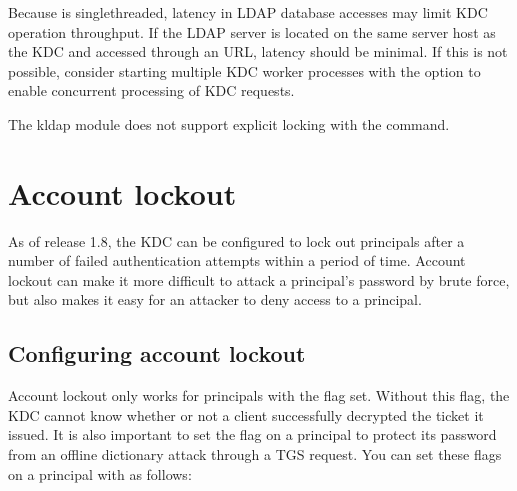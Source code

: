 \documentclass[letterpaper,10pt,english]{sphinxmanual}
\begin{document}
\sphinxAtStartPar
Because {\hyperref[\detokenize{admin/admin_commands/krb5kdc:krb5kdc-8}]{}} is single\sphinxhyphen{}threaded, latency in LDAP database
accesses may limit KDC operation throughput.  If the LDAP server is
located on the same server host as the KDC and accessed through an
 URL, latency should be minimal.  If this is not possible,
consider starting multiple KDC worker processes with the
{\hyperref[\detokenize{admin/admin_commands/krb5kdc:krb5kdc-8}]{}}  option to enable concurrent processing of KDC
requests.

\sphinxAtStartPar
The kldap module does not support explicit locking with the
{\hyperref[\detokenize{admin/admin_commands/kadmin_local:kadmin-1}]{}}  command.

\sphinxstepscope


\chapter{Account lockout}
\label{\detokenize{admin/lockout:account-lockout}}\label{\detokenize{admin/lockout:lockout}}\label{\detokenize{admin/lockout::doc}}
\sphinxAtStartPar
As of release 1.8, the KDC can be configured to lock out principals
after a number of failed authentication attempts within a period of
time.  Account lockout can make it more difficult to attack a
principal’s password by brute force, but also makes it easy for an
attacker to deny access to a principal.


\section{Configuring account lockout}
\label{\detokenize{admin/lockout:configuring-account-lockout}}
\sphinxAtStartPar
Account lockout only works for principals with the
 flag set.  Without this flag, the KDC cannot
know whether or not a client successfully decrypted the ticket it
issued.  It is also important to set the  flag on a
principal to protect its password from an off\sphinxhyphen{}line dictionary attack
through a TGS request.  You can set these flags on a principal with
{\hyperref[\detokenize{admin/admin_commands/kadmin_local:kadmin-1}]{}} as follows:
\end{document}
